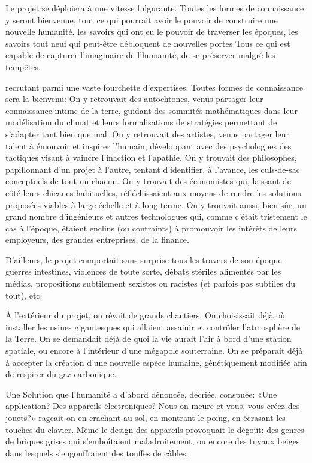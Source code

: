Le projet \nomProjet{} se déploiera à une vitesse fulgurante.  Toutes les
formes de connaissance y seront bienvenue, tout ce qui pourrait avoir le
pouvoir de construire une nouvelle humanité.  les savoirs qui ont eu le pouvoir
de traverser les époques, les savoirs tout neuf qui peut-être débloquent de
nouvelles portes Tous ce qui est capable de capturer l'imaginaire de
l'humanité, de se préserver malgré les tempêtes.



recrutant parmi une vaste fourchette d'expertises.  
Toutes formes de connaissance sera la bienvenu:
On y
retrouvait des autochtones, venus partager leur connaissance intime de la
terre, guidant des sommités mathé\-matiques dans leur modélisation du climat et
leurs formalisations de stra\-tégies permettant de s'adapter tant
bien que mal.  On y retrouvait des artistes, venus partager leur talent à
émouvoir et inspirer l'humain, développant avec des psychologues des
tactiques visant à vaincre l'in\-act\-ion et l'apathie.  On y trouvait des
philosophes, papillonnant d'un projet à l'autre, tentant d'identifier, à
l'avance, les culs-de-sac con\-cept\-uels de tout un chacun.  On y trouvait
des économistes qui, laissant de côté leurs chicanes habituelles,
réfléchissaient aux moyens de rendre les solutions proposées viables à
large échelle et à long terme.  On y trouvait aussi, bien sûr, un grand
nombre d'ingénieurs et autres technologues qui, comme c'était trist\-ement
le cas à l'époque, étaient enclins (ou contraints) à promouvoir les
intérêts de leurs employeurs, des grandes entreprises, de la finance.

D'ailleurs, le projet \nomProjet{} comportait sans surprise tous les
travers de son époque: guerres intestines, violences de toute sorte, débats
stériles alimentés par les médias, propositions
subti\-le\-ment sexistes ou racistes (et parfois pas subtiles du tout), etc.

À l'extérieur du projet, on rêvait de grands chantiers.  On choisissait
déjà où installer les usines gigantesques qui allaient assainir et
contrô\-ler l'at\-mosphère de la Terre. On se demandait déjà de quoi la vie
aurait l'air à bord d'une station spatiale, ou encore à l'intérieur d'une
mégapole souterraine. On se préparait déjà à accepter la création d'une
nouvelle espèce humaine, génétiquement modifiée afin de respirer du gaz
carbo\-nique.


Une Solution que l'humanité a d'abord dénoncée, décriée, conspuée: «Une
application? Des appareils électroniques? Nous on meure et vous, vous créez des
jouets?» rageait-on en crachant au sol, en montrant le poing, en écrasant
les touches du clavier.  Même le design des appareils provoquait le
dégoût: des genres de briques grises qui s'emboîtaient mala\-droi\-tement, ou
encore des tuyaux beiges dans lesquels s'engouffraient des touffes
de câbles.

